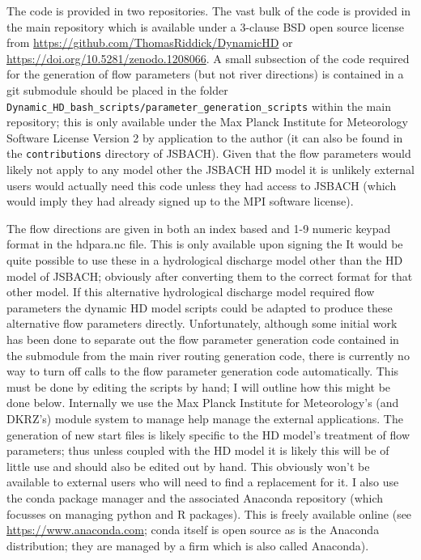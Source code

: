 \documentclass{article}
\begin{document}
The code is provided in two repositories. The vast bulk of the code is provided in the main repository which is available under a 3-clause BSD open source license from \url{https://github.com/ThomasRiddick/DynamicHD} or \url{https://doi.org/10.5281/zenodo.1208066}. A small subsection of the code required for the generation of flow parameters (but not river directions) is contained in a git submodule should be placed in the folder \\\lstinline[style=bash_input]{Dynamic_HD_bash_scripts/parameter_generation_scripts} within the main repository; this is only available under the Max Planck Institute for Meteorology Software License Version 2 by application to the author (it can also be found in the \lstinline[style=bash_input]{contributions} directory of JSBACH). Given that the flow parameters would likely not apply to any model other the JSBACH HD model it is unlikely external users would actually need this code unless they had access to JSBACH (which would imply they had already signed up to the MPI software license).

The flow directions are given in both an index based and 1-9 numeric keypad format in the hdpara.nc file. This is only available upon signing the  It would be quite possible to use these in a hydrological discharge model other than the HD model of JSBACH; obviously after converting them to the correct format for that other model. If this alternative hydrological discharge model required flow parameters the
dynamic HD model scripts could be adapted to produce these alternative flow parameters directly. Unfortunately, although some initial work has been done to separate out the flow parameter generation code contained in the submodule from the main river routing generation code, there is currently no way to turn off calls to the flow parameter generation code automatically. This must be done by editing the scripts by hand; I will outline how this might be done below. Internally we use the Max Planck Institute for Meteorology's (and DKRZ's) module system to manage help manage the external applications. The generation of new start files is likely specific to the HD model's treatment of flow parameters; thus unless coupled with the HD model it is likely this will be of little use and should also be edited out by hand. This obviously won't be available to external users who will need to find a replacement for it. I also use the conda package manager and the associated Anaconda repository (which focusses on managing python and R packages). This is freely available online (see \url{https://www.anaconda.com}; conda itself is open source as is the Anaconda distribution; they are managed by a firm which is also called Anaconda). 
\end{document}
